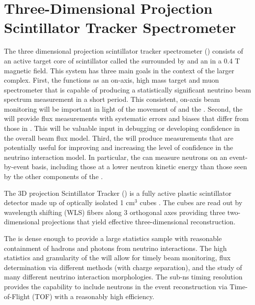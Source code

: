 \section{Three-Dimensional Projection Scintillator Tracker Spectrometer}
\label{sec:exsum-nd-mpt-3dst}

The three dimensional projection scintillator tracker spectrometer () consists of an active target core of scintillator called the  surrounded by  and an  in a 0.4 T magnetic field.  This system has three main goals in the context of the larger  complex.  First, the  functions as an on-axis, high mass target and muon spectrometer that is capable of producing a statistically significant neutrino beam spectrum measurement in a short period.  This consistent, on-axis beam monitoring will be important in light of the movement of  and the .  Second, the  will provide flux measurements with systematic errors and biases that differ from those in .  This will be valuable input in debugging or developing confidence in the overall beam flux model.  Third, the  will produce measurements that are potentially useful for improving and increasing the level of confidence in the neutrino interaction model. In particular, the  can measure neutrons on an event-by-event basis, including those at a lower neutron kinetic energy than those seen by the other components of the .  


The 3D projection Scintillator Tracker () is a fully active plastic scintillator detector made up of optically isolated 1 cm$^{3}$ cubes \cite{Sgalaberna:2017khy}.  The cubes are read out by wavelength shifting (WLS) fibers along 3 orthogonal axes providing three two-dimensional projections that yield effective three-dimensional reconstruction.  


The  is dense enough to provide a large statistics sample with reasonable containment of hadrons and photons from neutrino interactions. The high statistics and granularity  of the  will allow for timely beam monitoring, flux determination via different methods (with charge separation), and the study of many different neutrino interaction morphologies.  The sub-ns timing resolution provides the  capability to include neutrons in the event reconstruction via Time-of-Flight (TOF) with a reasonably high efficiency.  


